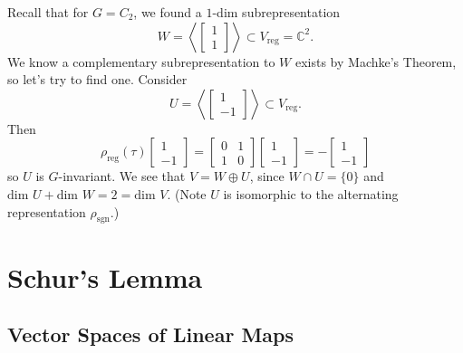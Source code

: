 \begin{frame}
\begin{example}
Recall that for  $G= C_2$, we found a $1$-dim subrepresentation 
\[ W = \left< \begin{bmatrix}1 \\ 1 \end{bmatrix} \right> \subset V_{\text{reg}}= \mathbb{C}^2 . \]
We know a complementary subrepresentation to $W$ exists by Machke's Theorem, so let's try to find one.  Consider
\[ U =  \left< \begin{bmatrix}1 \\ -1 \end{bmatrix} \right> \subset V_{\text{reg}}. \]
Then
\[ \rho_{\text{reg}}(\tau) \begin{bmatrix}1 \\ -1 \end{bmatrix} =  \begin{bmatrix} 0 & 1 \\ 1 & 0 \end{bmatrix} \begin{bmatrix}1 \\ -1 \end{bmatrix} = -  \begin{bmatrix}1 \\ -1 \end{bmatrix} \]
so $U$ is $G$-invariant.  We see that $V = W \oplus U$, since $W \cap U = \{ 0 \}$ and $\text{dim } U + \text{dim } W = 2 = \text{dim } V$.   (Note $U$ is isomorphic to the alternating representation $\rho_{\text{sgn}}$.)
\end{example}
\end{frame}

\section{Schur's Lemma}
\subsection{Vector Spaces of Linear Maps}

